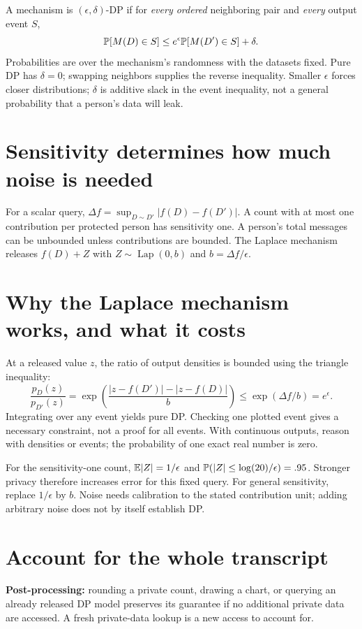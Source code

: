 \documentclass[11pt,letterpaper]{article}
\begin{document}
A mechanism is $(\epsilon,\delta)$-DP if for \emph{every ordered} neighboring pair
and \emph{every} output event $S$,
\[
\mathbb{P}[M(D)\in S]\le e^\epsilon\mathbb{P}[M(D')\in S]+\delta.
\]
Probabilities are over the mechanism's randomness with the datasets fixed.
Pure DP has $\delta=0$; swapping neighbors supplies the reverse inequality.
Smaller $\epsilon$ forces closer distributions; $\delta$ is additive slack in
the event inequality, not a general probability that a person's data will leak.

\section*{Sensitivity determines how much noise is needed}
For a scalar query, $\Delta f=\sup_{D\sim D'}|f(D)-f(D')|$. A count with at
most one contribution per protected person has sensitivity one. A person's total
messages can be unbounded unless contributions are bounded.
The Laplace mechanism releases $f(D)+Z$ with
$Z\sim\operatorname{Lap}(0,b)$ and $b=\Delta f/\epsilon$.

\newpage
\section*{Why the Laplace mechanism works, and what it costs}
At a released value $z$, the ratio of output densities is bounded using the
triangle inequality:
\[
\frac{p_D(z)}{p_{D'}(z)}
=\exp\!\left(\frac{|z-f(D')|-|z-f(D)|}{b}\right)
\le\exp(\Delta f/b)=e^\epsilon.
\]
Integrating over any event yields pure DP. Checking one plotted event gives a
necessary constraint, not a proof for all events. With continuous outputs, reason
with densities or events; the probability of one exact real number is zero.

For the sensitivity-one count, $\mathbb{E}|Z|=1/\epsilon$ and
$\mathbb{P}(|Z|\le\log(20)/\epsilon)=.95$. Stronger privacy therefore increases
error for this fixed query. For general sensitivity, replace $1/\epsilon$ by $b$.
Noise needs calibration to the stated contribution unit; adding arbitrary noise
does not by itself establish DP.

\section*{Account for the whole transcript}
\textbf{Post-processing:} rounding a private count, drawing a chart, or querying
an already released DP model preserves its guarantee if no additional private data
are accessed. A fresh private-data lookup is a new access to account for.
\end{document}
